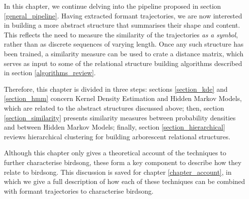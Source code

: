 \documentclass[../main.tex]{subfiles}
\begin{document}
 \label{chapter_hmms}
In this chapter, we continue delving into the pipeline proposed in section \ref{general_pipeline}. Having extracted formant trajectories, we are now interested in building a more abstract structure that summarises their shape and content. This reflects the need to measure the similarity of the trajectories \emph{as a symbol}, rather than as discrete sequences of varying length. Once any such structure has been trained, a similarity measure can be used to crate a distance matrix, which serves as input to some of the relational structure building algorithms described in section \ref{algorithms_review}.
\par Therefore, this chapter is divided in three steps: sections \ref{section_kde} and \ref{section_hmm} concern Kernel Density Estimation and Hidden Markov Models, which are related to the abstract structures discussed above; then, section \ref{section_similarity} presents similarity measures between probability densities and between Hidden Markov Models; finally, section \ref{section_hierarchical} reviews hierarchical clustering for building arborescent relational structures.
\par Although this chapter only gives a theoretical account of the techniques to further characterise birdsong, these form a key component to describe how they relate to birdsong. This discussion is saved for chapter \ref{chapter_account}, in which we give a full description of how each of these techniques can be combined with formant trajectories to characterise birdsong.
\end{document}
